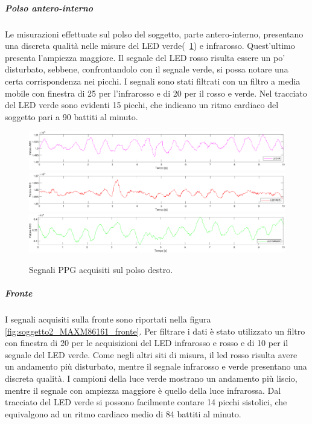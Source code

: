 \clearpage

\subparagraph{Polso antero-interno}

Le misurazioni effettuate sul polso del soggetto, parte antero-interno, presentano una discreta qualità nelle misure del LED verde(\Fig~\ref{fig:soggetto1_MAXM86161_polso}) e infrarosso. Quest'ultimo presenta l'ampiezza maggiore. Il segnale del LED rosso risulta essere un po' disturbato, sebbene, confrontandolo con il segnale verde, si possa notare una certa corrispondenza nei picchi. I segnali sono stati filtrati con un filtro a media mobile con finestra di  25 per l'infrarosso e di 20 per il rosso e verde. Nel tracciato del LED verde sono evidenti 15 picchi, che indicano un ritmo cardiaco del soggetto pari a 90 battiti al minuto.

\begin{figure}[h]
	\centering
	\includegraphics[width=1\linewidth]{ImageFiles/Misure Preliminari/Soggetto 1/MAXM86161/polso_ired}
	\includegraphics[width=1\linewidth]{ImageFiles/Misure Preliminari/Soggetto 1/MAXM86161/polso_red}
	\includegraphics[width=1\linewidth]{ImageFiles/Misure Preliminari/Soggetto 1/MAXM86161/polso_green}
	\caption{Segnali PPG acquisiti sul polso destro.}
	\label{fig:soggetto1_MAXM86161_polso}
\end{figure}

\clearpage

\subparagraph{Fronte}

I segnali acquisiti sulla fronte sono riportati nella figura \ref{fig:soggetto2_MAXM86161_fronte}. Per filtrare i dati è stato utilizzato un filtro con finestra di 20 per le acquisizioni del LED infrarosso e rosso e di 10 per il segnale del LED verde. Come negli altri siti di misura, il led rosso risulta avere un andamento più disturbato, mentre il segnale infrarosso e verde presentano una discreta qualità. I campioni della luce verde mostrano un andamento più liscio, mentre il segnale con ampiezza maggiore è quello della luce infrarossa. Dal tracciato del LED verde si possono facilmente contare 14 picchi sistolici, che equivalgono ad un ritmo cardiaco medio di 84 battiti al minuto.

